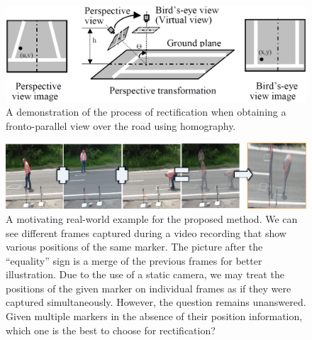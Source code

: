 \begin{figure}[t]
    \centerline{\includegraphics[width=0.8\linewidth]{figures/homography/road_rectification.png}}
    \caption[Road rectification]{A demonstration of the process of rectification when obtaining a fronto-parallel view over the road using homography. }
    \label{fig:RoadRectification}
\end{figure}

\begin{figure}[t]
    \centerline{\includegraphics[width=\linewidth]{figures/homography/markers_on_the_road.png}}
    \caption[Multiple markers on the road]{A motivating real-world example for the proposed method. We can see different frames captured during a video recording that show various positions of the same marker. The picture after the ``equality'' sign is a merge of the previous frames for better illustration. Due to the use of a static camera, we may treat the positions of the given marker on individual frames as if they were captured simultaneously. However, the question remains unanswered. Given multiple markers in the absence of their position information, which one is the best to choose for rectification?}
    \label{fig:MultipleMarkersOnRoad}
\end{figure}
